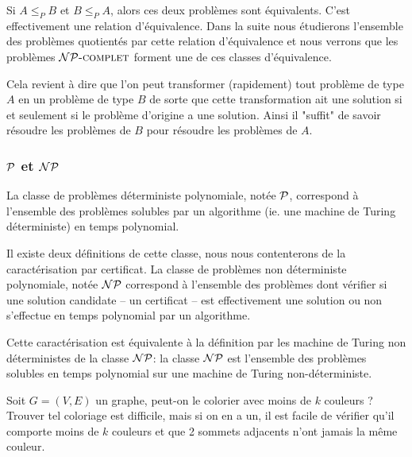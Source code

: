 \documentclass{standalone}
\begin{document}
\begin{defn}
	Si $A \leq_P B$ et $B \leq_P A$, alors ces deux problèmes sont équivalents. C'est effectivement une relation d'équivalence. Dans la suite nous étudierons l'ensemble des problèmes quotientés par cette relation d'équivalence et nous verrons que les problèmes $\mathcal{NP}\text{\textsc{-complet}}$ forment une de ces classes d'équivalence.
\end{defn}

Cela revient à dire que l'on peut transformer (rapidement) tout problème de type $A$ en un problème de type $B$ de sorte que cette transformation ait une solution si et seulement si le problème d'origine a une solution. Ainsi il "suffit" de savoir résoudre les problèmes de $B$ pour résoudre les problèmes de $A$.

\subsubsection{$\mathcal{P}$ et $\mathcal{NP}$}

\begin{defn}
	La classe de problèmes déterministe polynomiale, notée $\mathcal{P}$, correspond à l'ensemble des problèmes solubles par un algorithme (ie. une machine de Turing déterministe) en temps polynomial.
\end{defn}

\begin{defn}
	Il existe deux définitions de cette classe, nous nous contenterons de la caractérisation par certificat.	La classe de problèmes non déterministe polynomiale, notée $\mathcal{NP}$ correspond à l'ensemble des problèmes dont vérifier si une solution candidate -- un certificat -- est effectivement une solution ou non s'effectue en temps polynomial par un algorithme.
\end{defn}

\begin{rem}
		Cette caractérisation est équivalente à la définition par les machine de Turing non déterministes de la classe $\mathcal{NP}$: la classe $\mathcal{NP}$ est l'ensemble des problèmes solubles en temps polynomial sur une machine de Turing non-déterministe.
\end{rem}


\begin{exemple}
	Soit $G=(V,E)$ un graphe, peut-on le colorier avec moins de $k$ couleurs ? Trouver tel coloriage est difficile, mais si on en a un, il est facile de vérifier qu'il comporte moins de $k$ couleurs et que 2 sommets adjacents n'ont jamais la même couleur.
\end{exemple}
\end{document}
